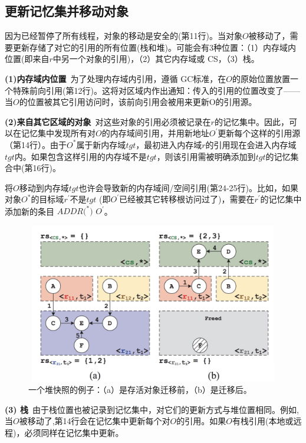 \subsection{更新记忆集并移动对象}

因为已经暂停了所有线程，对象的移动是安全的(第11行)。当对象$O$被移动了，需要更新存储了对它的引用的所有位置(栈和堆)。可能会有3种位置：（1）内存域内位置(即来自$r$中另一个对象的引用)，（2）其它内存域或 CS，（3）栈。

\textbf{(1)内存域内位置}\ 为了处理内存域内引用，遵循 GC标准，在$O$的原始位置放置一个特殊前向引用(第12行)。这将对区域内作出通知：传入的引用的位置改变了——当$O$的位置被其它引用访问时，该前向引用会被用来更新O的引用源。

\textbf{(2)来自其它区域的对象}\ 对这些对象的引用必须被记录在$r$的记忆集中。因此，可以在记忆集中发现所有对$O$的内存域间引用，并用新地址$O^{'}$更新每个这样的引用源（第14行）。由于$O^{*}$属于新内存域$tgt$，最初进入内存域$r$的引用现在会进入内存域$tgt$内。如果包含这样引用的内存域不是$tgt$，则该引用需被明确添加到${tgt}$的记忆集合中(第16行)。

将$O$移动到内存域${tgt}$也许会导致新的内存域间/空间引用(第24-25行)。比如，如果对象$O^{*}$的目标域$r^{'}$不是$tgt$ (即$O^{'}$已经被其它转移根访问过了)，需要在$r^{'}$的记忆集中添加新的条目 ${ADDR(}^{*})$  $O^{'}$。


\begin{figure}[H]
    \centering
    \includegraphics[width=12cm,height=7cm]{figure/snapshot.jpg}
    \caption{
        一个堆快照的例子：（a）是存活对象迁移前，（b）是迁移后。
    }
    \label{snapshot}
\end{figure}
\textbf{(3) 栈}\ 由于栈位置也被记录到记忆集中，对它们的更新方式与堆位置相同。例如,当$O$被移动了,第14行会在记忆集中更新每个对$O$的引用。如果$O$有栈引用(本地或远程)，必须同样在记忆集中更新。

